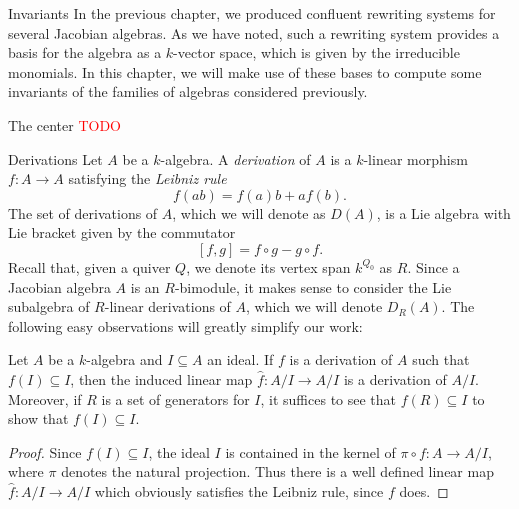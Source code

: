 \begin{chapter}{Invariants}
In the previous chapter, we produced confluent rewriting systems for several Jacobian algebras. As we have noted, such a rewriting system provides a basis for the algebra as a $k$-vector space, which is given by the irreducible monomials. In this chapter, we will make use of these bases to compute some invariants of the families of algebras considered previously.
\begin{section}{The center}
\textcolor{red}{TODO}
\end{section}
\begin{section}{Derivations}
Let $A$ be a $k$-algebra. A \emph{derivation} of $A$ is a $k$-linear morphism $f:A\to A$ satisfying the \emph{Leibniz rule}
\[f(ab)=f(a)b+af(b).\]
The set of derivations of $A$, which we will denote as $D(A)$, is a Lie algebra with Lie bracket given by the commutator
\[[f,g] = f\circ g - g\circ f.\]
Recall that, given a quiver $Q$, we denote its vertex span $k^{Q_0}$ as $R$. Since a Jacobian algebra $A$ is an $R$-bimodule, it makes sense to consider the Lie subalgebra of $R$-linear derivations of $A$, which we will denote $D_R(A)$. The following easy observations will greatly simplify our work:
\begin{obs}\label{derivation-quotient} Let $A$ be a $k$-algebra and $I\subseteq A$ an ideal. If $f$ is a derivation of $A$ such that $f(I)\subseteq I$, then the induced linear map $\hat{f}:A/I\to A/I$ is a derivation of $A/I$. Moreover, if $R$ is a set of generators for $I$, it suffices to see that $f(R)\subseteq I$ to show that $f(I)\subseteq I$.
\end{obs}
\begin{proof} Since $f(I)\subseteq I$, the ideal $I$ is contained in the kernel of $\pi\circ f:A\to A/I$, where $\pi$ denotes the natural projection. Thus there is a well defined linear map $\hat{f}:A/I\to A/I$ which obviously satisfies the Leibniz rule, since $f$ does.


\end{proof}
\end{section}
\end{chapter}
